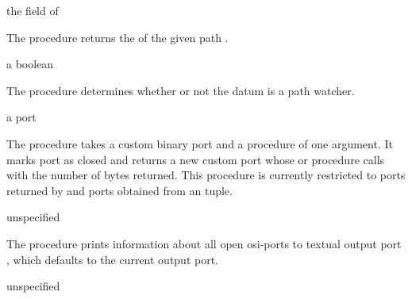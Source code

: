 \begin{procedure}
\end{procedure}
\returns{} the  field of 

The  procedure returns the  of the
given path .

\begin{procedure}
\end{procedure}
\returns{} a boolean

The  procedure determines whether or not the datum
 is a path watcher.

\begin{procedure}
\end{procedure}
\returns{} a port

The  procedure takes a custom binary port  and a
 procedure of one argument.
It marks port  as closed and returns a new custom port whose  or
 procedure calls  with the number of bytes returned.
This procedure is currently restricted to ports returned by 
and ports obtained from an  tuple.

\begin{procedure}
\end{procedure}
\returns{} unspecified

The  procedure prints information about all open
osi-ports to textual output port , which defaults to the
current output port.

\begin{procedure}
\end{procedure}
\returns{} unspecified

